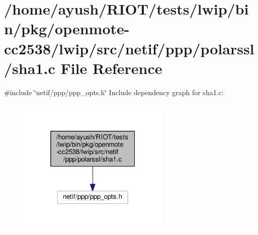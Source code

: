 \hypertarget{openmote-cc2538_2lwip_2src_2netif_2ppp_2polarssl_2sha1_8c}{}\section{/home/ayush/\+R\+I\+O\+T/tests/lwip/bin/pkg/openmote-\/cc2538/lwip/src/netif/ppp/polarssl/sha1.c File Reference}
\label{openmote-cc2538_2lwip_2src_2netif_2ppp_2polarssl_2sha1_8c}
{\ttfamily \#include \char`\"{}netif/ppp/ppp\+\_\+opts.\+h\char`\"{}}\newline
Include dependency graph for sha1.\+c\+:
\nopagebreak
\begin{figure}[H]
\begin{center}
\leavevmode
\includegraphics[width=205pt]{openmote-cc2538_2lwip_2src_2netif_2ppp_2polarssl_2sha1_8c__incl}
\end{center}
\end{figure}
